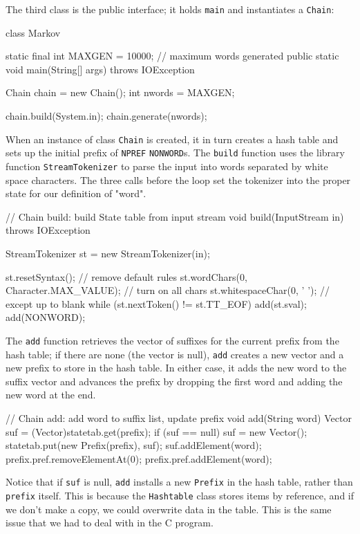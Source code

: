 The third class is the public interface; it holds \verb'main' and
instantiates a \verb'Chain':
\begin{wellcode}
    class Markov {
        static final int MAXGEN = 10000; // maximum words generated
        public static void main(String[] args) throws IOException
        {
            Chain chain = new Chain();
            int nwords = MAXGEN;

            chain.build(System.in);
            chain.generate(nwords);
        }
    }
\end{wellcode}

When an instance of class \verb'Chain' is created, it in turn creates a
hash table and sets up the initial prefix of \verb'NPREF' \verb'NONWORD's.
The \verb'build' function uses the library function \verb'StreamTokenizer'
to parse the input into words separated by white space characters.  The
three calls before the loop set the tokenizer into the proper state for our
definition of "word".
\begin{wellcode}
    // Chain build: build State table from input stream
    void build(InputStream in) throws IOException
    {
        StreamTokenizer st = new StreamTokenizer(in);

        st.resetSyntax();                     // remove default rules
        st.wordChars(0, Character.MAX_VALUE); // turn on all chars
        st.whitespaceChar(0, ' ');            // except up to blank
        while (st.nextToken() != st.TT_EOF)
            add(st.sval);
        add(NONWORD);
    }
\end{wellcode}

The \verb'add' function retrieves the vector of suffixes for the current
prefix from the hash table; if there are none (the vector is null),
\verb'add' creates a new vector and a new prefix to store in the hash
table. In either case, it adds the new word to the suffix vector and
advances the prefix by dropping the first word and adding the new word at
the end.
\begin{wellcode}
    // Chain add: add word to suffix list, update prefix
    void add(String word)
    {
        Vector suf = (Vector)statetab.get(prefix);
        if (suf == null) {
            suf = new Vector();
            statetab.put(new Prefix(prefix), suf);
        }
        suf.addElement(word);
        prefix.pref.removeElementAt(0);
        prefix.pref.addElement(word);
    }
\end{wellcode}
Notice that if \verb'suf' is null, \verb'add' installs a new \verb'Prefix'
in the hash table, rather than \verb'prefix' itself. This is because the
\verb'Hashtable' class stores items by reference, and if we don't make a
copy, we could overwrite data in the table. This is the same issue that we
had to deal with in the C program.


